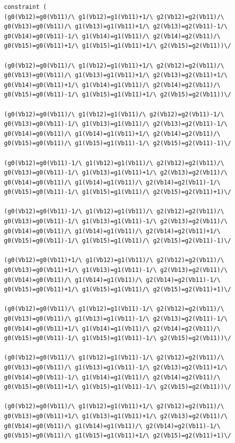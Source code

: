 \begin{lstlisting}[language=minizinc,numbers=none,caption={Encoding for 3Dblue piece1},label={lst:constraint}]
constraint ( 
(g0(Vb12)=g0(Vb11)/\ g1(Vb12)=g1(Vb11)+1/\ g2(Vb12)=g2(Vb11)/\ g0(Vb13)=g0(Vb11)/\ g1(Vb13)=g1(Vb11)+1/\ g2(Vb13)=g2(Vb11)-1/\ g0(Vb14)=g0(Vb11)-1/\ g1(Vb14)=g1(Vb11)/\ g2(Vb14)=g2(Vb11)/\ g0(Vb15)=g0(Vb11)+1/\ g1(Vb15)=g1(Vb11)+1/\ g2(Vb15)=g2(Vb11))\/ 

(g0(Vb12)=g0(Vb11)/\ g1(Vb12)=g1(Vb11)+1/\ g2(Vb12)=g2(Vb11)/\ g0(Vb13)=g0(Vb11)/\ g1(Vb13)=g1(Vb11)+1/\ g2(Vb13)=g2(Vb11)+1/\ g0(Vb14)=g0(Vb11)+1/\ g1(Vb14)=g1(Vb11)/\ g2(Vb14)=g2(Vb11)/\ g0(Vb15)=g0(Vb11)-1/\ g1(Vb15)=g1(Vb11)+1/\ g2(Vb15)=g2(Vb11))\/ 

(g0(Vb12)=g0(Vb11)/\ g1(Vb12)=g1(Vb11)/\ g2(Vb12)=g2(Vb11)-1/\ g0(Vb13)=g0(Vb11)-1/\ g1(Vb13)=g1(Vb11)/\ g2(Vb13)=g2(Vb11)-1/\ g0(Vb14)=g0(Vb11)/\ g1(Vb14)=g1(Vb11)+1/\ g2(Vb14)=g2(Vb11)/\ g0(Vb15)=g0(Vb11)/\ g1(Vb15)=g1(Vb11)-1/\ g2(Vb15)=g2(Vb11)-1)\/ 

(g0(Vb12)=g0(Vb11)-1/\ g1(Vb12)=g1(Vb11)/\ g2(Vb12)=g2(Vb11)/\ g0(Vb13)=g0(Vb11)-1/\ g1(Vb13)=g1(Vb11)+1/\ g2(Vb13)=g2(Vb11)/\ g0(Vb14)=g0(Vb11)/\ g1(Vb14)=g1(Vb11)/\ g2(Vb14)=g2(Vb11)-1/\ g0(Vb15)=g0(Vb11)-1/\ g1(Vb15)=g1(Vb11)/\ g2(Vb15)=g2(Vb11)+1)\/ 

(g0(Vb12)=g0(Vb11)-1/\ g1(Vb12)=g1(Vb11)/\ g2(Vb12)=g2(Vb11)/\ g0(Vb13)=g0(Vb11)-1/\ g1(Vb13)=g1(Vb11)-1/\ g2(Vb13)=g2(Vb11)/\ g0(Vb14)=g0(Vb11)/\ g1(Vb14)=g1(Vb11)/\ g2(Vb14)=g2(Vb11)+1/\ g0(Vb15)=g0(Vb11)-1/\ g1(Vb15)=g1(Vb11)/\ g2(Vb15)=g2(Vb11)-1)\/ 

(g0(Vb12)=g0(Vb11)+1/\ g1(Vb12)=g1(Vb11)/\ g2(Vb12)=g2(Vb11)/\ g0(Vb13)=g0(Vb11)+1/\ g1(Vb13)=g1(Vb11)-1/\ g2(Vb13)=g2(Vb11)/\ g0(Vb14)=g0(Vb11)/\ g1(Vb14)=g1(Vb11)/\ g2(Vb14)=g2(Vb11)-1/\ g0(Vb15)=g0(Vb11)+1/\ g1(Vb15)=g1(Vb11)/\ g2(Vb15)=g2(Vb11)+1)\/ 

(g0(Vb12)=g0(Vb11)/\ g1(Vb12)=g1(Vb11)-1/\ g2(Vb12)=g2(Vb11)/\ g0(Vb13)=g0(Vb11)/\ g1(Vb13)=g1(Vb11)-1/\ g2(Vb13)=g2(Vb11)-1/\ g0(Vb14)=g0(Vb11)+1/\ g1(Vb14)=g1(Vb11)/\ g2(Vb14)=g2(Vb11)/\ g0(Vb15)=g0(Vb11)-1/\ g1(Vb15)=g1(Vb11)-1/\ g2(Vb15)=g2(Vb11))\/ 

(g0(Vb12)=g0(Vb11)/\ g1(Vb12)=g1(Vb11)-1/\ g2(Vb12)=g2(Vb11)/\ g0(Vb13)=g0(Vb11)/\ g1(Vb13)=g1(Vb11)-1/\ g2(Vb13)=g2(Vb11)+1/\ g0(Vb14)=g0(Vb11)-1/\ g1(Vb14)=g1(Vb11)/\ g2(Vb14)=g2(Vb11)/\ g0(Vb15)=g0(Vb11)+1/\ g1(Vb15)=g1(Vb11)-1/\ g2(Vb15)=g2(Vb11))\/ 

(g0(Vb12)=g0(Vb11)/\ g1(Vb12)=g1(Vb11)+1/\ g2(Vb12)=g2(Vb11)/\ g0(Vb13)=g0(Vb11)+1/\ g1(Vb13)=g1(Vb11)+1/\ g2(Vb13)=g2(Vb11)/\ g0(Vb14)=g0(Vb11)/\ g1(Vb14)=g1(Vb11)/\ g2(Vb14)=g2(Vb11)-1/\ g0(Vb15)=g0(Vb11)/\ g1(Vb15)=g1(Vb11)+1/\ g2(Vb15)=g2(Vb11)+1)\/ 


\end{lstlisting}
